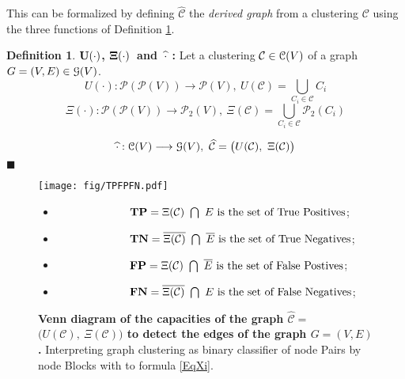 \documentclass[12pt]{article}
\theoremstyle{thmstyleone}%
\theoremstyle{definition}
\newtheorem{definition}{Definition}
\begin{document}
This can be formalized by defining $\widehat{\mathcal{C}}$
the {\it derived graph} from a clustering $\mathcal{C}$ using the three functions of Definition \ref{defUXI}.
%
\begin{definition} {\bf $\bf U(\cdot)$, $\bf \Xi(\cdot)$~and~$\bf \widehat{\cdot}$ :} Let a clustering $\mathcal{C}\in\EuScript{C}(V)$ of a graph $G=(V,E)\in\EuScript{G}(V)$. \label{defUXI}
\begin{equation}\label{EqU}
        U(\cdot):\mathcal{P}(\mathcal{P}(V)) \longrightarrow \mathcal{P}(V),~U(\mathcal{C})=\underset{{C_i\in\mathcal{C}}}{\bigcup}C_i
\end{equation}
%
\begin{equation}\label{EqXi}
        \Xi(\cdot):\mathcal{P}(\mathcal{P}(V)) \longrightarrow \mathcal{P}_2(V),~
        \Xi(\mathcal{C})= \underset{{C_i\in\mathcal{C}}}{\bigcup} \mathcal{P}_2({C_i})
\end{equation}

\begin{equation}\label{widehat}
        \widehat{\cdot}:\EuScript{C}(V)\longrightarrow \EuScript{G}(V),~\widehat{\mathcal{C}}=\big(U(\mathcal{C}),~\Xi(\mathcal{C})\big)
\end{equation}
$\blacksquare$
\end{definition}

\begin{figure}[h!] \centering
    \texttt{[image: fig/TPFPFN.pdf]}
 \begin{itemize}
  \item[] $~$$~$$~$$~$$~$$~$$~$$~$$~$$~$$~$$~$$~$$~$$~$$~$$~$$~$$~$$~$$~$$~$$~$$~$$~$$~$$~$$~$
  ${\bf TP}=\Xi(\mathcal{C})~\bigcap~E \text{ is the set of True Positives}$;

  \item[] $~$$~$$~$$~$$~$$~$$~$$~$$~$$~$$~$$~$$~$$~$$~$$~$$~$$~$$~$$~$$~$$~$$~$$~$$~$$~$$~$$~$
  ${\bf TN}=\overline{\Xi(\mathcal{C})}~\bigcap~\overline{E} \text{ is the set of True Negatives}$;

  \item[] $~$$~$$~$$~$$~$$~$$~$$~$$~$$~$$~$$~$$~$$~$$~$$~$$~$$~$$~$$~$$~$$~$$~$$~$$~$$~$$~$$~$
  ${\bf FP}=\Xi(\mathcal{C})~\bigcap~\overline{E} \text{ is the set of False Postives}$;

  \item[] $~$$~$$~$$~$$~$$~$$~$$~$$~$$~$$~$$~$$~$$~$$~$$~$$~$$~$$~$$~$$~$$~$$~$$~$$~$$~$$~$$~$
  ${\bf FN}=\overline{\Xi(\mathcal{C})}~\bigcap~E \text{ is the set of False Negatives}$;
  \normalsize
 \end{itemize}
\vspace{-0.30cm}
    \caption{{\bf Venn diagram of the capacities of the graph $\widehat{\mathcal{C}}=$$\big(U(\mathcal{C}),~\Xi(\mathcal{C})\big)$ to detect the edges of the graph $G=(V,E)$.} Interpreting graph clustering as binary classifier of node Pairs by node Blocks with to formula \ref{EqXi}.  \label{TPFPFN.FIG}}
\end{figure}
\end{document}
